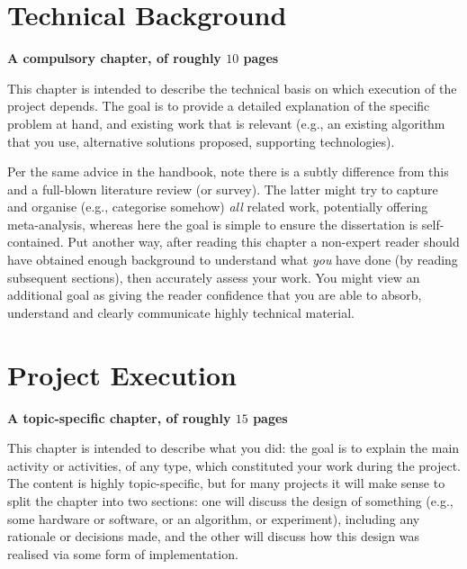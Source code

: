 \documentclass[
author={Veyndan Stuart},
supervisor={Prof. Dave Cliff},
degree={MEng},
title={Some Structural Guidelines for CS MEng Dissertations},
subtitle={},
type={enterprise},
year={2019}
]{thesis}
\begin{document}

    \chapter{Technical Background}
    \label{chap:technical}

    {\bf A compulsory chapter, of roughly $10$ pages}
    \vspace{1cm}

    \noindent
    This chapter is intended to describe the technical basis on which execution
    of the project depends. The goal is to provide a detailed explanation of
    the specific problem at hand, and existing work that is relevant (e.g., an
    existing algorithm that you use, alternative solutions proposed, supporting
    technologies).

    Per the same advice in the handbook, note there is a subtly difference from
    this and a full-blown literature review (or survey). The latter might try
    to capture and organise (e.g., categorise somehow) {\em all} related work,
    potentially offering meta-analysis, whereas here the goal is simple to
    ensure the dissertation is self-contained. Put another way, after reading
    this chapter a non-expert reader should have obtained enough background to
    understand what {\em you} have done (by reading subsequent sections), then
    accurately assess your work. You might view an additional goal as giving
    the reader confidence that you are able to absorb, understand and clearly
    communicate highly technical material.


    \chapter{Project Execution}
    \label{chap:execution}

    {\bf A topic-specific chapter, of roughly $15$ pages}
    \vspace{1cm}

    \noindent
    This chapter is intended to describe what you did: the goal is to explain
    the main activity or activities, of any type, which constituted your work
    during the project. The content is highly topic-specific, but for many
    projects it will make sense to split the chapter into two sections: one
    will discuss the design of something (e.g., some hardware or software, or
    an algorithm, or experiment), including any rationale or decisions made,
    and the other will discuss how this design was realised via some form of
    implementation.
\end{document}
